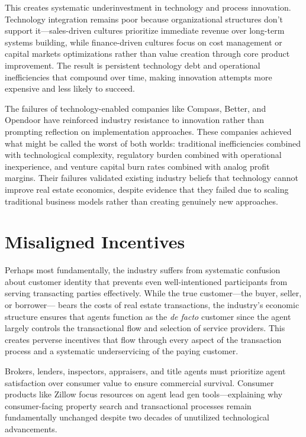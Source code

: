 This creates systematic underinvestment in technology and process innovation. Technology integration remains poor because organizational structures don't support it---sales-driven cultures prioritize immediate revenue over long-term systems building, while finance-driven cultures focus on cost management or capital markets optimizations rather than value creation through core product improvement. The result is persistent technology debt and operational inefficiencies that compound over time, making innovation attempts more expensive and less likely to succeed.

The failures of technology-enabled companies like Compass, Better, and Opendoor have reinforced industry resistance to innovation rather than prompting reflection on implementation approaches. These companies achieved what might be called the worst of both worlds: traditional inefficiencies combined with technological complexity, regulatory burden combined with operational inexperience, and venture capital burn rates combined with analog profit margins. Their failures validated existing industry beliefs that technology cannot improve real estate economics, despite evidence that they failed due to scaling traditional business models rather than creating genuinely new approaches.

\section{Misaligned Incentives}

Perhaps most fundamentally, the industry suffers from systematic confusion about customer identity that prevents even well-intentioned participants from serving transacting parties effectively. While the true customer---the buyer, seller, or borrower--- bears the costs of real estate transactions, the industry's economic structure ensures that agents function as the \textit{de facto} customer since the agent largely controls the transactional flow and selection of service providers. This creates perverse incentives that flow through every aspect of the transaction process and a systematic underservicing of the paying customer.

Brokers, lenders, inspectors, appraisers, and title agents must prioritize agent satisfaction over consumer value to ensure commercial survival. Consumer products like Zillow focus resources on agent lead gen tools---explaining why consumer-facing property search and transactional processes remain fundamentally unchanged despite two decades of unutilized technological advancements.


